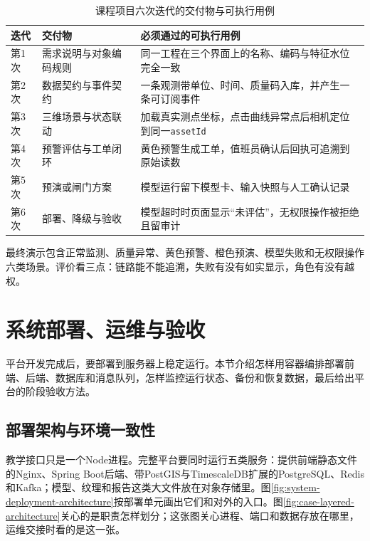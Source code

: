 \begin{table}[htbp]
\centering
\caption{课程项目六次迭代的交付物与可执行用例}
\label{tab:ch08-course-iterations}
\begin{tabular}{p{1.5cm}p{5.0cm}p{6.2cm}}
\toprule
迭代 & 交付物 & 必须通过的可执行用例 \\
\midrule
第1次 & 需求说明与对象编码规则 & 同一工程在三个界面上的名称、编码与特征水位完全一致 \\
第2次 & 数据契约与事件契约 & 一条观测带单位、时间、质量码入库，并产生一条可订阅事件 \\
第3次 & 三维场景与状态联动 & 加载真实测点坐标，点击曲线异常点后相机定位到同一\texttt{assetId} \\
第4次 & 预警评估与工单闭环 & 黄色预警生成工单，值班员确认后回执可追溯到原始读数 \\
第5次 & 预演或闸门方案 & 模型运行留下模型卡、输入快照与人工确认记录 \\
第6次 & 部署、降级与验收 & 模型超时时页面显示“未评估”，无权限操作被拒绝且留审计 \\
\bottomrule
\end{tabular}
\end{table}

最终演示包含正常监测、质量异常、黄色预警、橙色预演、模型失败和无权限操作六类场景。评价看三点：链路能不能追溯，失败有没有如实显示，角色有没有越权。

\section{系统部署、运维与验收}

平台开发完成后，要部署到服务器上稳定运行。本节介绍怎样用容器编排部署前端、后端、数据库和消息队列，怎样监控运行状态、备份和恢复数据，最后给出平台的阶段验收方法。

\subsection{部署架构与环境一致性}

教学接口只是一个Node进程。完整平台要同时运行五类服务：提供前端静态文件的Nginx、Spring Boot后端、带PostGIS与TimescaleDB扩展的PostgreSQL、Redis和Kafka；模型、纹理和报告这类大文件放在对象存储里。图\ref{fig:system-deployment-architecture}按部署单元画出它们和对外的入口。图\ref{fig:case-layered-architecture}关心的是职责怎样划分；这张图关心进程、端口和数据存放在哪里，运维交接时看的是这一张。

